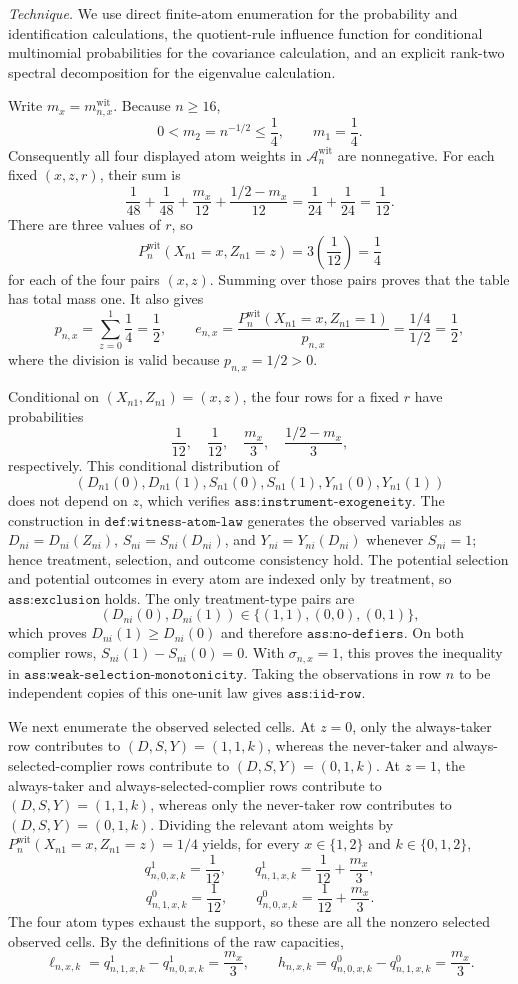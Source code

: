\emph{Technique.} We use direct finite-atom enumeration for the probability and identification calculations, the quotient-rule influence function for conditional multinomial probabilities for the covariance calculation, and an explicit rank-two spectral decomposition for the eigenvalue calculation.

Write \(m_x=m^{\mathrm{wit}}_{n,x}\). Because \(n\geq16\),
\[
0<m_2=n^{-1/2}\leq\frac14,
\qquad
m_1=\frac14.
\]
Consequently all four displayed atom weights in \(\mathcal A_n^{\mathrm{wit}}\) are nonnegative. For each fixed \((x,z,r)\), their sum is
\[
\frac1{48}+\frac1{48}+\frac{m_x}{12}
+\frac{1/2-m_x}{12}
=\frac1{24}+\frac1{24}=\frac1{12}.
\]
There are three values of \(r\), so
\[
P_n^{\mathrm{wit}}(X_{n1}=x,Z_{n1}=z)=3\left(\frac1{12}\right)=\frac14
\]
for each of the four pairs \((x,z)\). Summing over those pairs proves that the table has total mass one. It also gives
\[
p_{n,x}=\sum_{z=0}^1\frac14=\frac12,
\qquad
e_{n,x}=\frac{P_n^{\mathrm{wit}}(X_{n1}=x,Z_{n1}=1)}{p_{n,x}}
=\frac{1/4}{1/2}=\frac12,
\]
where the division is valid because \(p_{n,x}=1/2>0\).

Conditional on \((X_{n1},Z_{n1})=(x,z)\), the four rows for a fixed \(r\) have probabilities
\[
\frac1{12},\quad \frac1{12},\quad
\frac{m_x}{3},\quad \frac{1/2-m_x}{3},
\]
respectively. This conditional distribution of
\[
(D_{n1}(0),D_{n1}(1),S_{n1}(0),S_{n1}(1),Y_{n1}(0),Y_{n1}(1))
\]
does not depend on \(z\), which verifies \(\texttt{ass:instrument-exogeneity}\). The construction in \(\texttt{def:witness-atom-law}\) generates the observed variables as \(D_{ni}=D_{ni}(Z_{ni})\), \(S_{ni}=S_{ni}(D_{ni})\), and \(Y_{ni}=Y_{ni}(D_{ni})\) whenever \(S_{ni}=1\); hence treatment, selection, and outcome consistency hold. The potential selection and potential outcomes in every atom are indexed only by treatment, so \(\texttt{ass:exclusion}\) holds. The only treatment-type pairs are
\[
(D_{ni}(0),D_{ni}(1))\in\{(1,1),(0,0),(0,1)\},
\]
which proves \(D_{ni}(1)\geq D_{ni}(0)\) and therefore \(\texttt{ass:no-defiers}\). On both complier rows, \(S_{ni}(1)-S_{ni}(0)=0\). With \(\sigma_{n,x}=1\), this proves the inequality in \(\texttt{ass:weak-selection-monotonicity}\). Taking the observations in row \(n\) to be independent copies of this one-unit law gives \(\texttt{ass:iid-row}\).

We next enumerate the observed selected cells. At \(z=0\), only the always-taker row contributes to \((D,S,Y)=(1,1,k)\), whereas the never-taker and always-selected-complier rows contribute to \((D,S,Y)=(0,1,k)\). At \(z=1\), the always-taker and always-selected-complier rows contribute to \((D,S,Y)=(1,1,k)\), whereas only the never-taker row contributes to \((D,S,Y)=(0,1,k)\). Dividing the relevant atom weights by \(P_n^{\mathrm{wit}}(X_{n1}=x,Z_{n1}=z)=1/4\) yields, for every \(x\in\{1,2\}\) and \(k\in\{0,1,2\}\),
\[
q^1_{n,0,x,k}=\frac1{12},
\qquad
q^1_{n,1,x,k}=\frac1{12}+\frac{m_x}{3},
\]
\[
q^0_{n,1,x,k}=\frac1{12},
\qquad
q^0_{n,0,x,k}=\frac1{12}+\frac{m_x}{3}.
\]
The four atom types exhaust the support, so these are all the nonzero selected observed cells. By the definitions of the raw capacities,
\[
\ell_{n,x,k}=q^1_{n,1,x,k}-q^1_{n,0,x,k}=\frac{m_x}{3},
\qquad
h_{n,x,k}=q^0_{n,0,x,k}-q^0_{n,1,x,k}=\frac{m_x}{3}.
\]

